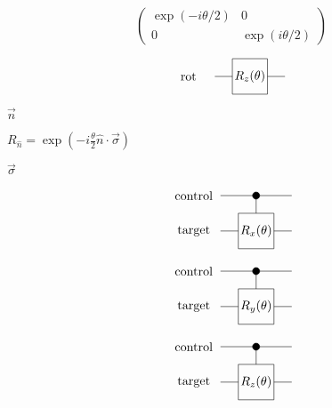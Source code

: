 \documentclass{article}
\begin{document}
\[
\begin{pmatrix}
\exp(-i \theta/2) & 0 \\
0 & \exp(i \theta/2)
\end{pmatrix}
\]
\pagebreak

\[
             \begin{tikzpicture}[scale=.5]
             \node[draw=none] at (-3.5, 0) {rot};

             \draw (-2,0) -- (-1, 0);
             \draw (1, 0) -- (2, 0);
             \draw (-1,-1)--(-1,1)--(1,1)--(1,-1)--cycle;
             \node[draw=none] at (0, 0) {$R_z(\theta)$};
             \end{tikzpicture}
 \]
\pagebreak

$\vec{n}$
\pagebreak

$R_{\hat{n}} = \exp \left(- i \frac{\theta}{2} \hat{n} \cdot \vec{\sigma} \right) $
\pagebreak

$\vec{\sigma}$
\pagebreak

\[
             \begin{tikzpicture}[scale=.5]
             \node[draw=none] at (-3.5, 2) {control};
             \node[draw=none] at (-3.5, 0) {target};

             \draw (-2, 2) -- (2, 2);
             \draw[fill=black] (0, 2) circle (.2);
             \draw (0, 2) -- (0, 1);
             
             \draw (-2,0) -- (-1, 0);
             \draw (1, 0) -- (2, 0);
             \draw (-1,-1)--(-1,1)--(1,1)--(1,-1)--cycle;
             \node[draw=none] at (0, 0) {$R_x(\theta)$};
             \end{tikzpicture}
 \]
\pagebreak

\[
             \begin{tikzpicture}[scale=.5]
             \node[draw=none] at (-3.5, 2) {control};
             \node[draw=none] at (-3.5, 0) {target};

             \draw (-2, 2) -- (2, 2);
             \draw[fill=black] (0, 2) circle (.2);
             \draw (0, 2) -- (0, 1);
             
             \draw (-2,0) -- (-1, 0);
             \draw (1, 0) -- (2, 0);
             \draw (-1,-1)--(-1,1)--(1,1)--(1,-1)--cycle;
             \node[draw=none] at (0, 0) {$R_y(\theta)$};
             \end{tikzpicture}
 \]
\pagebreak

\[
             \begin{tikzpicture}[scale=.5]
             \node[draw=none] at (-3.5, 2) {control};
             \node[draw=none] at (-3.5, 0) {target};

             \draw (-2, 2) -- (2, 2);
             \draw[fill=black] (0, 2) circle (.2);
             \draw (0, 2) -- (0, 1);
             
             \draw (-2,0) -- (-1, 0);
             \draw (1, 0) -- (2, 0);
             \draw (-1,-1)--(-1,1)--(1,1)--(1,-1)--cycle;
             \node[draw=none] at (0, 0) {$R_z(\theta)$};
             \end{tikzpicture}
 \]
\pagebreak
\end{document}
